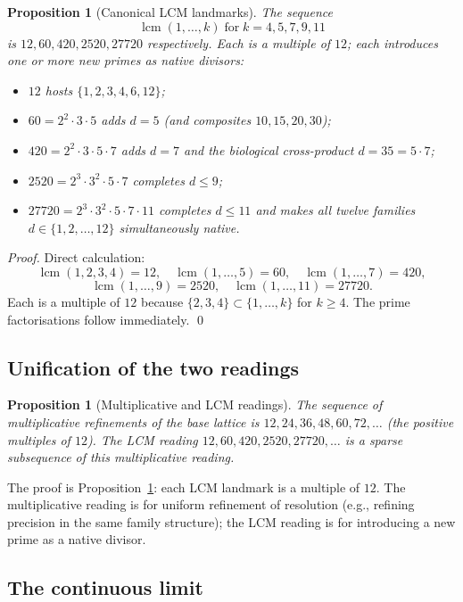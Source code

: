 \documentclass[11pt,a4paper]{article}
\newtheorem{proposition}[theorem]{Proposition}
\theoremstyle{definition}
\theoremstyle{remark}
\DeclareMathOperator{\lcm}{lcm}
\begin{document}
\begin{proposition}[Canonical LCM landmarks]\label{prop:tower}
The sequence
\[
\lcm(1,\ldots,k) \;\text{for}\; k=4,5,7,9,11
\]
is $12,60,420,2520,27720$ respectively. Each is a multiple of $12$; each introduces one or more new primes as native divisors:
\begin{itemize}[leftmargin=*]
\item $12$ hosts $\{1,2,3,4,6,12\}$;
\item $60 = 2^{2}\cdot 3\cdot 5$ adds $d=5$ (and composites $10,15,20,30$);
\item $420 = 2^{2}\cdot 3\cdot 5\cdot 7$ adds $d=7$ and the biological cross-product $d=35=5\cdot 7$;
\item $2520 = 2^{3}\cdot 3^{2}\cdot 5\cdot 7$ completes $d\le 9$;
\item $27720 = 2^{3}\cdot 3^{2}\cdot 5\cdot 7\cdot 11$ completes $d\le 11$ and makes all twelve families $d\in\{1,2,\ldots,12\}$ simultaneously native.
\end{itemize}
\end{proposition}

\begin{proof}
Direct calculation:
\[
\lcm(1,2,3,4)=12,\quad \lcm(1,\ldots,5)=60,\quad \lcm(1,\ldots,7)=420,
\]
\[
\lcm(1,\ldots,9)=2520,\quad \lcm(1,\ldots,11)=27720.
\]
Each is a multiple of $12$ because $\{2,3,4\}\subset\{1,\ldots,k\}$ for $k\ge 4$. The prime factorisations follow immediately. \qed
\end{proof}

\subsection{Unification of the two readings}

\begin{proposition}[Multiplicative and LCM readings]\label{prop:unification}
The sequence of multiplicative refinements of the base lattice is $12,24,36,48,60,72,\ldots$ (the positive multiples of $12$). The LCM reading $12,60,420,2520,27720,\ldots$ is a sparse subsequence of this multiplicative reading.
\end{proposition}

The proof is Proposition~\ref{prop:tower}: each LCM landmark is a multiple of $12$. The multiplicative reading is for uniform refinement of resolution (e.g., refining precision in the same family structure); the LCM reading is for introducing a new prime as a native divisor.

\subsection{The continuous limit}
\end{document}

